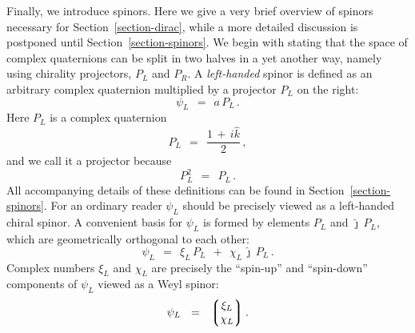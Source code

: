 \documentclass[epsfig,12pt]{article}
\newcommand{\jj}{\hat\jmath}
\newcommand{\kk}{\hat k}
\begin{document}
	Finally, we introduce spinors.
	Here we give a very brief overview of spinors necessary for Section~\ref{section-dirac}, while
	a more detailed discussion is postponed until Section~\ref{section-spinors}.
	We begin with stating that the space of complex quaternions can be split in two halves in a yet another way,
	namely using chirality projectors, $ P_L $ and $ P_R $.
	A \emph{left-handed} spinor is defined as an arbitrary complex quaternion multiplied by 
	a projector $ P_L $ on the right:
\begin{equation}
	\psi_L	~~=~~	a\,P_L\,.
\end{equation}
	Here $ P_L $ is a complex quaternion
\begin{equation}
	P_L	~~=~~	\frac{1 \,+\, i\kk} 2\,,
\end{equation}
	and we call it a projector because
\[
	P_L^2	~~=~~	P_L\,.
\]
	All accompanying details of these definitions can be found in Section~\ref{section-spinors}.
	For an ordinary reader $ \psi_L $ should be precisely viewed as a left-handed
	chiral spinor.
	A convenient basis for $ \psi_L $ is formed by elements $ P_L $ and $ \jj\,P_L $,
	which are geometrically orthogonal to each other:
\begin{equation}
\label{lbasis}
	\psi_L	~~=~~	\xi_L\,P_L  ~~+~~  \chi_L\,\jj\,P_L\,.
\end{equation}
	Complex numbers $ \xi_L $ and $ \chi_L $ are precisely the ``spin-up'' and ``spin-down''
	components of $ \psi_L $ viewed as a Weyl spinor:
\begin{equation}
	\psi_L	~~=~~	\left\lgroup
				\begin{matrix}
					\xi_L \\
					\chi_L
                		\end{matrix}
			\right\rgroup.
\end{equation}
\end{document}
